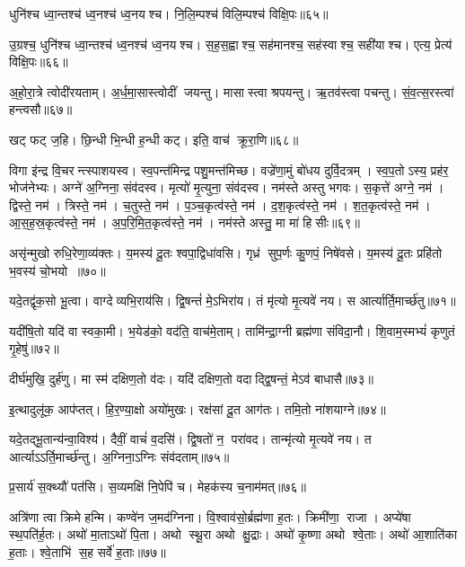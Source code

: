 धुनि॑श्च ध्वा॒न्तश्च॑ ध्व॒नश्च॑ ध्व॒नयश्च। नि॒लि॒म्पश्च॑ विलि॒म्पश्च॑ विक्षि॒पः॥६५॥
\anuvakamend

उ॒ग्रश्च॒ धुनि॑श्च ध्वा॒न्तश्च॑ ध्व॒नश्च॑ ध्व॒नयश्च। स॒ह॒स॒ह्वाश्च॒ सह॑मानश्च॒ सह॑स्वाश्च॒ सही॑याश्च। एत्य॒ प्रेत्य॑ विक्षि॒पः॥६६॥
\anuvakamend


अ॒हो॒रा॒त्रे त्वोदी॑रयताम्। अ॒र्ध॒मा॒सास्त्वोदीं जयन्तु। मासास्त्वा श्रपयन्तु। ऋ॒तव॑स्त्वा पचन्तु। सं॒व॒त्स॒रस्त्वा॑ हन्त्वसौ॥६७॥
\anuvakamend

खट् फट् ज॒हि। छि॒न्धी भि॒न्धी ह॒न्धी कट्। इति॒ वाच॑ क्रूरा॒णि॥६८॥
\anuvakamend

विगा इ॑न्द्र वि॒चरन्त्स्पाशयस्व। स्व॒पन्त॑मिन्द्र पशु॒मन्त॑मिच्छ। वज्रे॑णा॒मुं बो॑धय दुर्वि॒दत्रम्। स्व॒प॒तोऽस्य॒ प्रह॑र॒ भोज॑नेभ्यः। अग्ने॑ अ॒ग्निना॒ संव॑दस्व। मृत्यो॑ मृ॒त्युना॒ संव॑दस्व। नम॑स्ते अस्तु भगवः। स॒कृत्ते॑ अग्ने॒ नम॑। द्विस्ते॒ नम॑। त्रिस्ते॒ नम॑। च॒तुस्ते॒ नम॑। प॒ञ्च॒कृत्व॑स्ते॒ नम॑। द॒श॒कृत्व॑स्ते॒ नम॑। श॒त॒कृत्व॑स्ते॒ नम॑। आ॒स॒ह॒स्र॒कृत्व॑स्ते॒ नम॑। अ॒प॒रि॒मि॒त॒कृत्व॑स्ते॒ नम॑। नम॑स्ते अस्तु॒ मा मा॑ हिसीः॥६९॥
\anuvakamend[त्रिस्ते॒ नम॑ स॒प्त च॑]

असृ॑न्मुखो रुधि॒रेणा॒व्य॑क्तः। य॒मस्य॑ दू॒तः  श्वपा॒द्विधा॑वसि। गृध्र॑ सुप॒र्णः कु॒णपं॒ निषे॑वसे। य॒मस्य॑ दू॒तः प्रहि॑तो भ॒वस्य॑ चो॒भयो॥७०॥
\anuvakamend

यदे॒तद्वृ॑क॒सो भू॒त्वा। वाग्देव्यभि॒राय॑सि। द्वि॒षन्तं॑ मे॒ऽभिरा॑य। तं मृ॑त्यो मृ॒त्यवे॑ नय। स आर्त्यार्ति॒मार्च्छ॑तु॥७१॥
\anuvakamend

यदी॑षि॒तो यदि॑ वा स्वका॒मी। भ॒येड॑को॒ वद॑ति॒ वाच॑मे॒ताम्। तामि॑न्द्रा॒ग्नी ब्रह्म॑णा संविदा॒नौ। शि॒वाम॒स्मभ्यं॑ कृणुतं गृ॒हेषु॑॥७२॥
\anuvakamend

दीर्घ॑मुखि॒ दुर्\mbox{}ह॑णु। मा स्म॑ दक्षिण॒तो व॑दः। यदि॑ दक्षिण॒तो वदाद्द्वि॒षन्तं॒ मेऽव॑ बाधासै॥७३॥
\anuvakamend

इ॒त्थादुलू॑क॒ आप॑प्तत्। हि॒र॒ण्या॒क्षो अयो॑मुखः। रक्ष॑सां दू॒त आग॑तः। तमि॒तो ना॑शयाग्ने॥७४॥
\anuvakamend


यदे॒तद्भू॒तान्य॑न्वा॒विश्य॑। दैवीं॒ वाचं॑ व॒दसि॑। द्वि॒षतो॑ न॒ परा॑वद। तान्मृ॑त्यो मृ॒त्यवे॑ नय। त आर्त्याऽऽर्ति॒मार्च्छ॑न्तु। अ॒ग्निना॒ऽग्निः संव॑दताम्॥७५॥
\anuvakamend


प्र॒सार्य॑ स॒क्थ्यौ॑ पत॑सि। स॒व्यमक्षि॑ नि॒पेपि॑ च। मेहक॑स्य च॒नाम॑मत्॥७६॥
\anuvakamend


अत्रि॑णा त्वा क्रिमे हन्मि। कण्वे॑न ज॒मद॑ग्निना। वि॒श्वाव॑सो॒र्ब्रह्म॑णा ह॒तः। क्रिमी॑णा॒ राजा। अप्ये॑षा स्थ॒पति॑र्\mbox{}ह॒तः। अथो॑ मा॒ताऽथो॑ पि॒ता। अथो स्थू॒रा अथो क्षु॒द्राः। अथो॑ कृ॒ष्णा अथो श्वे॒ताः। अथो॑ आ॒शाति॑का ह॒ताः। श्वे॒ताभि॑ स॒ह सर्वे॑ ह॒ताः॥७७॥
\anuvakamend


